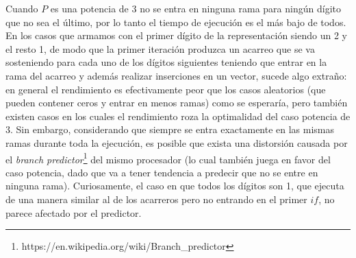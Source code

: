 	Cuando $P$ es una potencia de 3 no se entra en ninguna rama para ningún dígito que no sea el último, por lo tanto el tiempo de ejecución es el más bajo de todos. En los casos que armamos con el primer dígito de la representación siendo un 2 y el resto 1, de modo que la primer iteración produzca un acarreo que se va sosteniendo para cada uno de los dígitos siguientes teniendo que entrar en la rama del acarreo y además realizar inserciones en un vector, sucede algo extraño: en general el rendimiento es efectivamente peor que los casos aleatorios (que pueden contener ceros y entrar en menos ramas) como se esperaría, pero también existen casos en los cuales el rendimiento roza la optimalidad del caso potencia de 3. Sin embargo, considerando que siempre se entra exactamente en las mismas ramas durante toda la ejecución, es posible que exista una distorsión causada por el \emph{branch predictor}\footnote{https://en.wikipedia.org/wiki/Branch_predictor} del mismo procesador (lo cual también juega en favor del caso potencia, dado que va a tener tendencia a predecir que no se entre en ninguna rama). Curiosamente, el caso en que todos los dígitos son 1, que ejecuta de una manera similar al de los acarreros pero no entrando en el primer $if$, no parece afectado por el predictor.
